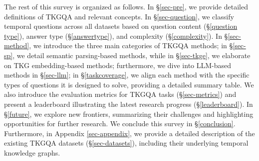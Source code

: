 The rest of this survey is organized as follows. In §\ref{sec-pre}, we provide detailed definitions of TKGQA and relevant concepts. In §\ref{sec-question}, we classify temporal questions across all datasets based on 
question content (§\ref{question type}), answer type (§\ref{answertype}), and complexity (§\ref{complexity}).
In §\ref{sec-method}, we introduce the three main categories of TKGQA methods; in §\ref{sec-sp}, we detail semantic parsing-based methods, while in §\ref{sec-tkge}, we elaborate on TKG embedding-based methods; furthermore, we dive into LLM-based methods in §\ref{sec-llm}; in §\ref{taskcoverage}, we align each method with the specific types of questions it is designed to solve, providing a detailed summary table. We also introduce the evaluation metrics for TKGQA tasks (§\ref{sec-metrics}) and present a leaderboard illustrating the latest research progress (§\ref{leaderboard}).
In §\ref{future}, we explore new frontiers, summarizing their challenges and highlighting opportunities for further research. We conclude this survey in §\ref{conclusion}. Furthermore, in Appendix \ref{sec-appendix}, we provide a detailed description of the existing TKGQA datasets (§\ref{sec-datasets}), including their underlying temporal knowledge graphs. 

